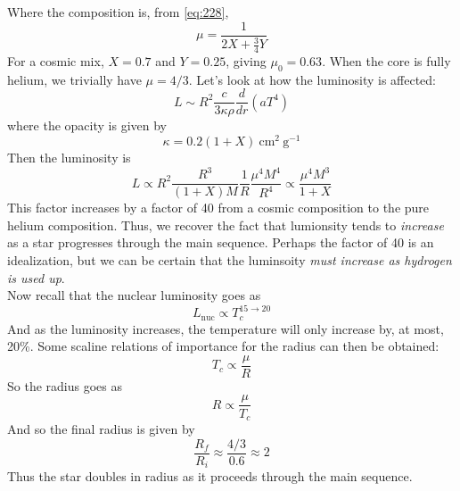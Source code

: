 \documentclass[10pt]{article}
\numberwithin{equation}{section}
\newcommand{\n}{\noindent}
\begin{document}
    Where the composition is, from \eqref{eq:228},
    \begin{equation}
      \label{eq:230}
      \mu = \frac{1}{2X+\frac{3}{4}Y}
    \end{equation}
    For a cosmic mix, $X=0.7$ and $Y=0.25$, giving $\mu_0=0.63$. When
    the core is fully helium, we trivially have $\mu=4/3$. Let's look
    at how the luminosity is affected:
    \begin{equation}
      \label{eq:231}
      L\sim R^2\frac{c}{3\kappa\rho}\frac{d}{dr}\left(aT^4\right)
    \end{equation}
    where the opacity is given by
    \begin{equation}
      \label{eq:232}
      \kappa = 0.2(1+X)\ \mathrm{cm^2\ g^{-1}}
    \end{equation}
    Then the luminosity is
    \begin{equation}
      \label{eq:233}
      L\propto R^2\frac{R^3}{(1+X)M}\frac{1}{R}\frac{\mu^4M^4}{R^4}\propto\frac{\mu^4M^3}{1+X}
    \end{equation}
    This factor increases by a factor of 40 from a cosmic composition
    to the pure helium composition. Thus, we recover the fact that
    lumionsity tends to \emph{increase} as a star progresses through
    the main sequence. Perhaps the factor of 40 is an idealization,
    but we can be certain that the luminsoity \emph{must increase as
      hydrogen is used up}.\\

    \n Now recall that the nuclear luminosity goes as
    \begin{equation}
      \label{eq:235}
      L_{\mathrm{nuc}}\propto T_c^{15\to 20}
    \end{equation}
    And as the luminosity increases, the temperature will only
    increase by, at most, 20\%. Some scaline relations of importance
    for the radius can then be obtained:
    \begin{equation}
      \label{eq:236}
      T_c\propto\frac{\mu}{R}
    \end{equation}
    So the radius goes as
    \begin{equation}
      \label{eq:237}
      R\propto\frac{\mu}{T_c}
    \end{equation}
    And so the final radius is given by
    \begin{equation}
      \label{eq:238}
      \frac{R_f}{R_i}\approx \frac{4/3}{0.6}\approx 2
    \end{equation}
    Thus the star doubles in radius as it proceeds through the main sequence.
\end{document}
